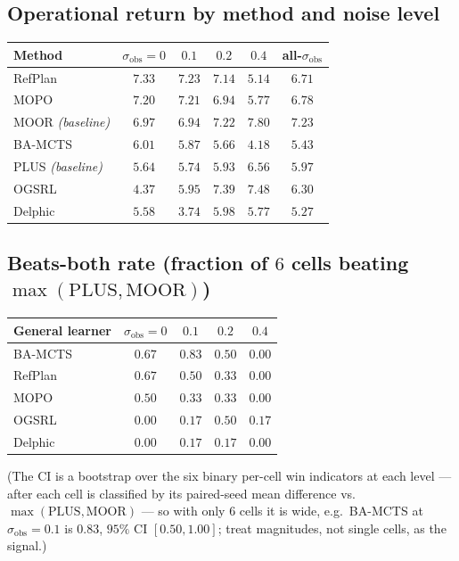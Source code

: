 \documentclass[11pt]{article}
\newcommand{\sobs}{\sigma_{\mathrm{obs}}}
\begin{document}
\subsection{Operational return by method and noise level}
\begin{longtable}{@{}lcccc|c@{}}
\toprule
Method & $\sobs{=}0$ & $0.1$ & $0.2$ & $0.4$ & all-$\sobs$ \\
\midrule
RefPlan & $7.33$ & $7.23$ & $7.14$ & $5.14$ & $6.71$ \\
MOPO    & $7.20$ & $7.21$ & $6.94$ & $5.77$ & $6.78$ \\
MOOR \emph{(baseline)} & $6.97$ & $6.94$ & $7.22$ & $\mathbf{7.80}$ & $\mathbf{7.23}$ \\
BA-MCTS & $6.01$ & $5.87$ & $5.66$ & $4.18$ & $5.43$ \\
PLUS \emph{(baseline)} & $5.64$ & $5.74$ & $5.93$ & $6.56$ & $5.97$ \\
OGSRL   & $4.37$ & $5.95$ & $7.39$ & $7.48$ & $6.30$ \\
Delphic & $5.58$ & $3.74$ & $5.98$ & $5.77$ & $5.27$ \\
\bottomrule
\end{longtable}

\subsection{Beats-both rate (fraction of $6$ cells beating $\max(\text{PLUS},\text{MOOR})$)}
\begin{longtable}{@{}lcccc@{}}
\toprule
General learner & $\sobs{=}0$ & $0.1$ & $0.2$ & $0.4$ \\
\midrule
BA-MCTS & $0.67$ & $\mathbf{0.83}$ & $0.50$ & $0.00$ \\
RefPlan & $0.67$ & $0.50$ & $0.33$ & $0.00$ \\
MOPO    & $0.50$ & $0.33$ & $0.33$ & $0.00$ \\
OGSRL   & $0.00$ & $0.17$ & $0.50$ & $0.17$ \\
Delphic & $0.00$ & $0.17$ & $0.17$ & $0.00$ \\
\bottomrule
\end{longtable}
\noindent(The CI is a bootstrap over the six binary per-cell win indicators at each
level --- after each cell is classified by its paired-seed mean difference vs.\
$\max(\text{PLUS},\text{MOOR})$ --- so with only $6$ cells it is wide, e.g.\ BA-MCTS
at $\sobs{=}0.1$ is $0.83$, $95\%$ CI $[0.50,1.00]$; treat magnitudes, not single
cells, as the signal.)
\end{document}
